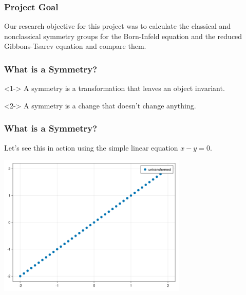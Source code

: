 \documentclass{beamer}
\begin{document}
\begin{frame}
    \frametitle{Project Goal}
    Our research objective for this project was to calculate the classical and nonclassical symmetry groups for the Born-Infeld equation and the reduced Gibbons-Tsarev equation and compare them.
\end{frame}



\begin{frame}
    \frametitle{What is a Symmetry?}
    \begin{definition}<1->
        A symmetry is a transformation that leaves an object invariant.
    \end{definition}
    \vspace*{0.5in}
    \begin{definition}<2->
        A symmetry is a change that doesn't change anything.
    \end{definition}
\end{frame}


\begin{frame}
    \frametitle{What is a Symmetry?}
    Let's see this in action using the simple linear equation $x-y=0$.\\
    \begin{center}
        \includegraphics[width=9cm]{y=x.png}
    \end{center}
\end{frame}
\end{document}
